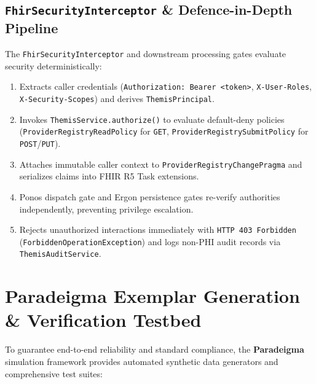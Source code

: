 \subsection{\texttt{FhirSecurityInterceptor} \& Defence-in-Depth Pipeline}
The \texttt{FhirSecurityInterceptor} and downstream processing gates evaluate security deterministically:
\begin{enumerate}
    \item Extracts caller credentials (\texttt{Authorization: Bearer <token>}, \texttt{X-User-Roles}, \texttt{X-Security-Scopes}) and derives \texttt{ThemisPrincipal}.
    \item Invokes \texttt{ThemisService.authorize()} to evaluate default-deny policies (\texttt{ProviderRegistryReadPolicy} for \texttt{GET}, \texttt{ProviderRegistrySubmitPolicy} for \texttt{POST}/\texttt{PUT}).
    \item Attaches immutable caller context to \texttt{ProviderRegistryChangePragma} and serializes claims into FHIR R5 Task extensions.
    \item Ponos dispatch gate and Ergon persistence gates re-verify authorities independently, preventing privilege escalation.
    \item Rejects unauthorized interactions immediately with \texttt{HTTP 403 Forbidden} (\texttt{ForbiddenOperationException}) and logs non-PHI audit records via \texttt{ThemisAuditService}.
\end{enumerate}

\section{Paradeigma Exemplar Generation \& Verification Testbed}
\label{sec:pr_paradeigma}

To guarantee end-to-end reliability and standard compliance, the \textbf{Paradeigma} simulation framework provides automated synthetic data generators and comprehensive test suites:

